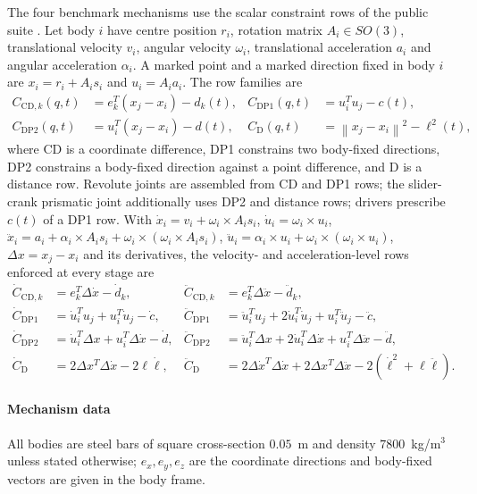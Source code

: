 The four benchmark mechanisms use the scalar constraint rows of the public suite
\cite{kissel2022absolute}. Let body $i$ have centre position $r_i$, rotation matrix $A_i\in SO(3)$,
translational velocity $v_i$, angular velocity $\omega_i$, translational acceleration $a_i$ and
angular acceleration $\alpha_i$. A marked point and a marked direction fixed in body $i$ are
$x_i=r_i+A_i s_i$ and $u_i=A_i a_i$. The row families are
\begin{align}
  C_{\mathrm{CD},k}(q,t) &= e_k^T\left(x_j-x_i\right)-d_k(t), &
  C_{\mathrm{DP1}}(q,t) &= u_i^T u_j-c(t),\\
  C_{\mathrm{DP2}}(q,t) &= u_i^T\left(x_j-x_i\right)-d(t), &
  C_{\mathrm{D}}(q,t) &= \left\|x_j-x_i\right\|^2-\ell^2(t),
  \label{eq:lower-pair-row-families}
\end{align}
where CD is a coordinate difference, DP1 constrains two body-fixed directions, DP2 constrains a
body-fixed direction against a point difference, and D is a distance row. Revolute joints are
assembled from CD and DP1 rows; the slider-crank prismatic joint additionally uses DP2 and distance
rows; drivers prescribe $c(t)$ of a DP1 row. With
$\dot x_i = v_i+\omega_i\times A_i s_i$, $\dot u_i = \omega_i\times u_i$,
$\ddot x_i = a_i+\alpha_i\times A_i s_i+\omega_i\times(\omega_i\times A_i s_i)$,
$\ddot u_i = \alpha_i\times u_i+\omega_i\times(\omega_i\times u_i)$, $\Delta x=x_j-x_i$ and
its derivatives, the velocity- and acceleration-level rows enforced at every stage are
\begin{align}
  \dot C_{\mathrm{CD},k} &= e_k^T\Delta\dot x-\dot d_k, &
  \ddot C_{\mathrm{CD},k} &= e_k^T\Delta\ddot x-\ddot d_k,\\
  \dot C_{\mathrm{DP1}} &= \dot u_i^T u_j+u_i^T\dot u_j-\dot c, &
  \ddot C_{\mathrm{DP1}} &= \ddot u_i^T u_j+2\dot u_i^T\dot u_j+u_i^T\ddot u_j-\ddot c,\\
  \dot C_{\mathrm{DP2}} &= \dot u_i^T\Delta x+u_i^T\Delta\dot x-\dot d, &
  \ddot C_{\mathrm{DP2}} &= \ddot u_i^T\Delta x+2\dot u_i^T\Delta\dot x+u_i^T\Delta\ddot x-\ddot d,\\
  \dot C_{\mathrm{D}} &= 2\Delta x^T\Delta\dot x-2\ell\dot\ell, &
  \ddot C_{\mathrm{D}} &= 2\Delta\dot x^T\Delta\dot x+2\Delta x^T\Delta\ddot x-2(\dot\ell^2+\ell\ddot\ell).
  \label{eq:lower-pair-acceleration-rows}
\end{align}

\paragraph{Mechanism data}
All bodies are steel bars of square cross-section $0.05$~m and density $7800$~kg/m$^3$ unless
stated otherwise; $e_x,e_y,e_z$ are the coordinate directions and body-fixed vectors are given in
the body frame.

